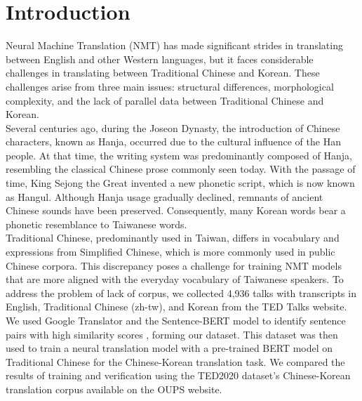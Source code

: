 \documentclass[PhD]{PHlab-thesis}
\begin{document}








\newpage
\setcounter{page}{1}


\chapter{Introduction}
Neural Machine Translation (NMT) has made significant strides in translating between English and other Western languages, but it faces considerable challenges in translating between Traditional Chinese and Korean. These challenges arise from three main issues: structural differences, morphological complexity, and the lack of parallel data between Traditional Chinese and Korean. \\
Several centuries ago, during the Joseon Dynasty, the introduction of Chinese characters, known as Hanja, occurred due to the cultural influence of the Han people. At that time, the writing system was predominantly composed of Hanja, resembling the classical Chinese prose commonly seen today. With the passage of time, King Sejong the Great invented a new phonetic script, which is now known as Hangul. Although Hanja usage gradually declined, remnants of ancient Chinese sounds have been preserved. Consequently, many Korean words bear a phonetic resemblance to Taiwanese words.\\
Traditional Chinese, predominantly used in Taiwan, differs in vocabulary and expressions from Simplified Chinese, which is more commonly used in public Chinese corpora. This discrepancy poses a challenge for training NMT models that are more aligned with the everyday vocabulary of Taiwanese speakers.
To address the problem of lack of corpus, we collected 4,936 talks with transcripts in English, Traditional Chinese (zh-tw), and Korean from the TED Talks website\cite{tedTalks}. We used Google Translator\cite{googletrans} and the Sentence-BERT\cite{reimers2019sentence} model to identify sentence pairs with high similarity scores , forming our dataset. This dataset was then used to train a neural translation model with a pre-trained BERT model on Traditional Chinese for the Chinese-Korean translation task.\cite{ckip-bert} We compared the results of training and verification using the TED2020 dataset's Chinese-Korean translation corpus available on the OUPS website.\cite{reimers-2020-multilingual-sentence-bert}
\end{document}

